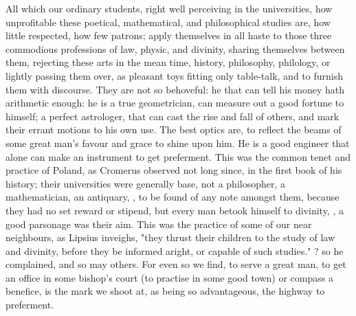 
All which our ordinary students, right well perceiving in the universities, how
unprofitable these poetical, mathematical, and philosophical studies are, how
little respected, how few patrons; apply themselves in all haste to those three
commodious professions of law, physic, and divinity, sharing themselves between
them, rejecting these arts in the mean time, history,
philosophy, philology, or lightly passing them over, as pleasant toys fitting
only table-talk, and to furnish them with discourse. They are not so behoveful:
he that can tell his money hath arithmetic enough: he is a true geometrician,
can measure out a good fortune to himself; a perfect astrologer, that can cast
the rise and fall of others, and mark their errant motions to his own use. The
best optics are, to reflect the beams of some great man's favour and grace to
shine upon him. He is a good engineer that alone can make an instrument to get
preferment. This was the common tenet and practice of Poland, as Cromerus
observed not long since, in the first book of his history; their universities
were generally base, not a philosopher, a mathematician, an antiquary, \etc{},
to be found of any note amongst them, because they had no set reward or
stipend, but every man betook himself to divinity, , a good parsonage was their aim. This was the
practice of some of our near neighbours, as Lipsius
inveighs, "they thrust their children to the study of law and divinity, before
they be informed aright, or capable of such studies." ?
so he complained, and so may others. For even so we find, to serve a great man,
to get an office in some bishop's court (to practise in some good town) or
compass a benefice, is the mark we shoot at, as being so advantageous, the
highway to preferment.

